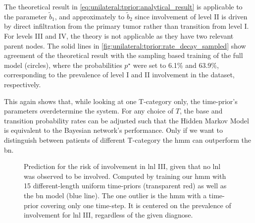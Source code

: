 \documentclass[\relativeRoot/main.tex]{subfiles}
\begin{document}
The theoretical result in \cref{eq:unilateral:tprior:analytical_result} is applicable to the parameter $\tilde{b}_1$, and approximately to $\tilde{b}_2$ since involvement of level II is driven by direct infiltration from the primary tumor rather than transition from level I. For levels III and IV, the theory is not applicable as they have two relevant parent nodes. The solid lines in \cref{fig:unilateral:tprior:rate_decay_sampled} show agreement of the theoretical result with the sampling based training of the full model (circles), where the probabilities $p^{\star}$ were set to 6.1\% and 63.9\%, corresponding to the prevalence of level I and II involvement in the dataset, respectively.


This again shows that, while looking at one T-category only, the time-prior's parameters overdetermine the system. For any choice of $T$, the base and transition probability rates can be adjusted such that the Hidden Markov Model is equivalent to the Bayesian network's performance. Only if we want to distinguish between patients of different T-category the \gls{hmm} can outperform the \gls{bn}.

\begin{figure}
    \centering
    \def\svgwidth{0.7\textwidth}
    
    \caption[A risk prediction for varying lengths of time priors]{Prediction for the risk of involvement in \gls{lnl} III, given that no \gls{lnl} was observed to be involved. Computed by training our \gls{hmm} with 15 different-length uniform time-priors (transparent red) as well as the \gls{bn} model (blue line). The one outlier is the \gls{hmm} with a time-prior covering only one time-step. It is centered on the prevalence of involvement for \gls{lnl} III, regardless of the given diagnose.}
    \label{fig:unilateral:tprior:multi_length_risk}
\end{figure}
\end{document}
